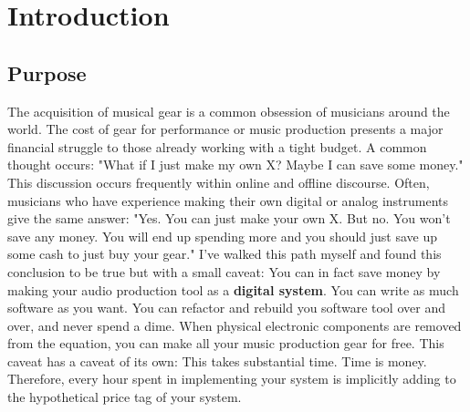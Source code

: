 \documentclass[acmlarge,screen]{acmart}
\begin{document}

\maketitle

\section{Introduction}
\subsection{Purpose}
	The acquisition of musical gear is a common obsession of musicians around the world. The cost of gear for performance or music production presents a major financial struggle to those already working with a tight budget. A common thought occurs: "What if I just make my own X? Maybe I can save some money." This discussion occurs frequently within online and offline discourse. Often, musicians who have experience making their own digital or analog instruments give the same answer: "Yes. You can just make your own X. But no. You won't save any money. You will end up spending more and you should just save up some cash to just buy your gear." I've walked this path myself and found this conclusion to be true but with a small caveat: You can in fact save money by making your audio production tool as a \textbf{digital system}. You can write as much software as you want. You can refactor and rebuild you software tool over and over, and never spend a dime. When physical electronic components are removed from the equation, you can make all your music production gear for free. This caveat has a caveat of its own: This takes substantial time. Time is money. Therefore, every hour spent in implementing your system is implicitly adding to the hypothetical price tag of your system.
	
\end{document}

